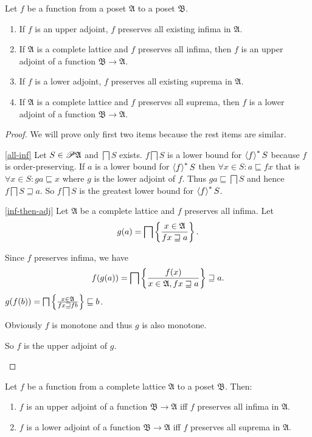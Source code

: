 \begin{thm}
Let $f$ be a function from a poset $\mathfrak{A}$ to a poset $\mathfrak{B}$.
\begin{enumerate}
\item \label{all-inf}If $f$ is an upper adjoint, $f$ preserves all existing
infima in $\mathfrak{A}$.
\item \label{inf-then-adj}If $\mathfrak{A}$ is a complete lattice and
$f$ preserves all infima, then $f$ is an upper adjoint of a function
$\mathfrak{B}\rightarrow\mathfrak{A}$.
\item If $f$ is a lower adjoint, $f$ preserves all existing suprema in
$\mathfrak{A}$.
\item If $\mathfrak{A}$ is a complete lattice and $f$ preserves all suprema,
then $f$ is a lower adjoint of a function $\mathfrak{B}\rightarrow\mathfrak{A}$.
\end{enumerate}
\end{thm}
\begin{proof}
We will prove only first two items because the rest items are similar.
\begin{widedisorder}
\item [{\ref{all-inf}}] Let $S\in\mathscr{P}\mathfrak{A}$ and $\bigsqcap S$
exists. $f\bigsqcap S$ is a lower bound for $\left\langle f\right\rangle ^{\ast}S$ because
$f$ is order-preserving. If $a$ is a lower bound for $\left\langle f\right\rangle ^{\ast}S$
then $\forall x\in S:a\sqsubseteq fx$ that is $\forall x\in S:ga\sqsubseteq x$
where $g$ is the lower adjoint of $f$. Thus $ga\sqsubseteq\bigsqcap S$
and hence $f\bigsqcap S\sqsupseteq a$. So $f\bigsqcap S$ is the
greatest lower bound for $\left\langle f\right\rangle ^{\ast}S$.
\item [{\ref{inf-then-adj}}] Let $\mathfrak{A}$ be a complete lattice
and $f$ preserves all infima. Let
\[
g(a)=\bigsqcap\left\{ \frac{x\in\mathfrak{A}}{fx\sqsupseteq a}\right\}.
\]



Since $f$ preserves infima, we have
\[
f(g(a))=\bigsqcap\left\{ \frac{f(x)}{x\in\mathfrak{A},fx\sqsupseteq a}\right\}\sqsupseteq a.
\]
$g(f(b))=\bigsqcap\left\{ \frac{x\in\mathfrak{A}}{fx\sqsupseteq fb}\right\}\sqsubseteq b$.


Obviously $f$ is monotone and thus $g$ is also monotone.


So $f$ is the upper adjoint of $g$.

\end{widedisorder}
\end{proof}
\begin{cor}\label{adj-cons}
Let $f$ be a function from a complete lattice $\mathfrak{A}$ to
a poset $\mathfrak{B}$. Then:
\begin{enumerate}
\item $f$ is an upper adjoint of a function $\mathfrak{B}\rightarrow\mathfrak{A}$
iff $f$ preserves all infima in $\mathfrak{A}$.
\item $f$ is a lower adjoint of a function $\mathfrak{B}\rightarrow\mathfrak{A}$
iff $f$ preserves all suprema in $\mathfrak{A}$.
\end{enumerate}
\end{cor}

